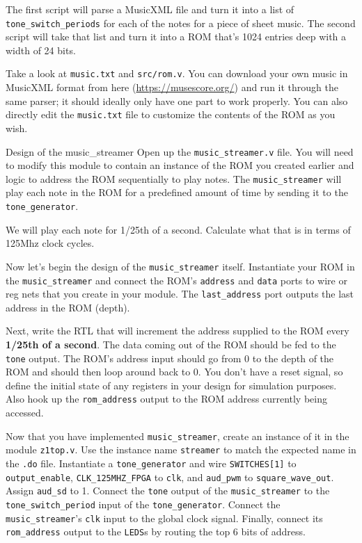 \documentclass[11pt]{article}
\makeatletter
\renewcommand{\section}
{\@startsection {section}{1}{0pt}
 {-2ex}
 {1ex}
 {\bfseries\Large}}
\makeatother
\begin{document}
The first script will parse a MusicXML file and turn it into a list of \verb|tone_switch_periods| for each of the notes for a piece of sheet music. The second script will take that list and turn it into a ROM that's 1024 entries deep with a width of 24 bits.

Take a look at \verb|music.txt| and \verb|src/rom.v|. You can download your own music in MusicXML format from here (\url{https://musescore.org/}) and run it through the same parser; it should ideally only have one part to work properly. You can also directly edit the \verb|music.txt| file to customize the contents of the ROM as you wish.

\section{Design of the music\_streamer}
Open up the \verb|music_streamer.v| file. You will need to modify this module to contain an instance of the ROM you created earlier and logic to address the ROM sequentially to play notes. The \verb|music_streamer| will play each note in the ROM for a predefined amount of time by sending it to the \verb|tone_generator|.

We will play each note for 1/25th of a second. Calculate what that is in terms of 125Mhz clock cycles.

Now let's begin the design of the \verb|music_streamer| itself. Instantiate your ROM in the \verb|music_streamer| and connect the ROM's \verb|address| and \verb|data| ports to wire or reg nets that you create in your module.  The \verb|last_address| port outputs the last address in the ROM (depth).

Next, write the RTL that will increment the address supplied to the ROM every \textbf{1/25th of a second}. The data coming out of the ROM should be fed to the \verb|tone| output. The ROM's address input should go from 0 to the depth of the ROM and should then loop around back to 0. You don't have a reset signal, so define the initial state of any registers in your design for simulation purposes. Also hook up the \verb|rom_address| output to the ROM address currently being accessed.

Now that you have implemented \verb|music_streamer|, create an instance of it in the module \verb|z1top.v|. Use the instance name \verb|streamer| to match the expected name in the \verb|.do| file. Instantiate a \verb|tone_generator| and wire \verb|SWITCHES[1]| to \verb|output_enable|, \verb|CLK_125MHZ_FPGA| to \verb|clk|, and \verb|aud_pwm| to \verb|square_wave_out|.  Assign \verb|aud_sd| to 1.  Connect the \verb|tone| output of the \verb|music_streamer| to the \verb|tone_switch_period| input of the \verb|tone_generator|. Connect the \verb|music_streamer|'s \verb|clk| input to the global clock signal. Finally, connect  its \verb|rom_address| output to the \verb|LEDS|s by routing the top 6 bits of address.
\end{document}
